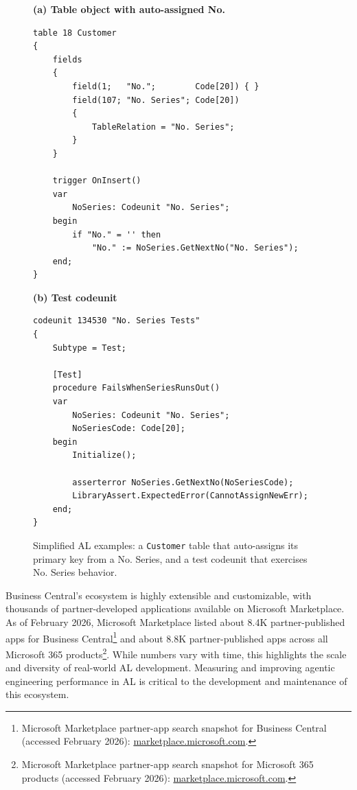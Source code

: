 \documentclass{article}
\begin{document}
\begin{figure}[t]
\vskip 0.05in
\begin{center}
\begin{minipage}{0.98\columnwidth}
{\scriptsize
\noindent\textbf{(a) Table object with auto-assigned No.}
\begin{verbatim}
table 18 Customer
{
    fields
    {
        field(1;   "No.";        Code[20]) { }
        field(107; "No. Series"; Code[20])
        {
            TableRelation = "No. Series";
        }
    }

    trigger OnInsert()
    var
        NoSeries: Codeunit "No. Series";
    begin
        if "No." = '' then
            "No." := NoSeries.GetNextNo("No. Series");
    end;
}
\end{verbatim}

\vspace{2pt}

\noindent\textbf{(b) Test codeunit}
\begin{verbatim}
codeunit 134530 "No. Series Tests"
{
    Subtype = Test;

    [Test]
    procedure FailsWhenSeriesRunsOut()
    var
        NoSeries: Codeunit "No. Series";
        NoSeriesCode: Code[20];
    begin
        Initialize();

        asserterror NoSeries.GetNextNo(NoSeriesCode);
        LibraryAssert.ExpectedError(CannotAssignNewErr);
    end;
}
\end{verbatim}
}
\end{minipage}
\end{center}
\caption{Simplified AL examples: a \texttt{Customer} table that auto-assigns its primary key from a No. Series, and a test codeunit that exercises No. Series behavior.}
\label{fig:al-snippets}
\vskip -0.1in
\end{figure}

Business Central's ecosystem is highly extensible and customizable, with thousands of partner-developed applications available on Microsoft Marketplace. As of February 2026, Microsoft Marketplace listed about 8.4K partner-published apps for Business Central\footnote{Microsoft Marketplace partner-app search snapshot for Business Central (accessed February 2026): \href{https://marketplace.microsoft.com/en-us/search/products?product=dynamics-365-business-central\&page=1\&filters=partners}{marketplace.microsoft.com}.} and about 8.8K partner-published apps across all Microsoft 365 products\footnote{Microsoft Marketplace partner-app search snapshot for Microsoft 365 products (accessed February 2026): \href{https://marketplace.microsoft.com/en-us/search/products?page=1\&filters=partners\&product=excel\%3Bofficemetaos\%3Bonenote\%3Bpowerpoint\%3Boutlook\%3Bproject\%3Bsharepoint\%3Bteams\%3Bword\%3Bviva}{marketplace.microsoft.com}.}. While numbers vary with time, this highlights the scale and diversity of real-world AL development. Measuring and improving agentic engineering performance in AL is critical to the development and maintenance of this ecosystem.
\end{document}
